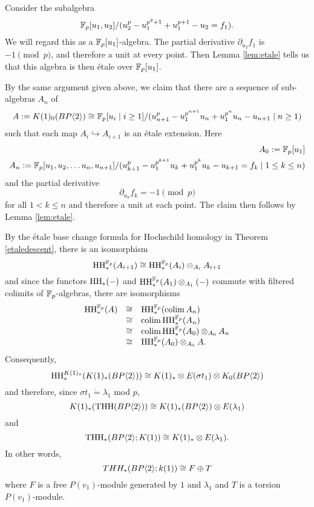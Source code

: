 \begin{ex}
	Consider the subalgebra
	\[
	\mathbb{F}_p[u_1,u_2]/(u_2^p-u_1^{p^2+1}+u_1^{p+1}-u_2=f_1).
	\]
	We will regard this as a $\mathbb{F}_p[u_1]$-algebra. The partial derivative $\partial_{u_2}f_1$ is $-1\pmod{p}$, and therefore a unit at every point. Then Lemma \ref{lem:etale} tells us that this algebra is then \'etale over $\mathbb{F}_p[u_1]$.
\end{ex} 

By the same argument given above, we claim that there are a sequence of sub-algebras $A_n$ of 
	\[
	A:= K(1)_0 (BP\langle 2 \rangle)\cong\mathbb{F}_p[u_i\mid i\geq 1]/(u_{n+1}^p-u_1^{p^{n+1}}u_n+u_1^{p^n}u_n-u_{n+1}\mid n\geq 1)
	\]
such that each map $A_i\hookrightarrow A_{i+1}$ is an \'etale extension. Here 
\begin{align*}
	A_0:=\mathbb{F}_p[u_1]\\
	A_n:=\mathbb{F}_p[u_1,u_2,\ldots u_n,u_{n+1}]/(u_{k+1}^p-u_1^{p^{k+1}}u_k+u_1^{p^k}u_k-u_{k+1} =f_{k} \mid 1\le k\le n)
\end{align*}
and the partial derivative 
\[\partial_{u_k}f_{k}=-1\pmod{p}\] 
for all $1<k\le n$ and therefore a unit at each point. The claim then follows by Lemma \ref{lem:etale}.

By the \'etale base change formula for Hochschild homology in Theorem \ref{etaledescent}, there is an isomorphism 
\[ \operatorname{HH}_*^{\mathbb{F}_p}(A_{i+1})\cong \operatorname{HH}_*^{\mathbb{F}_p}(A_i)\otimes_{A_i}A_{i+1}\]
and since the functors $\operatorname{HH}_*(-)$ and $ \operatorname{HH}_*^{\mathbb{F}_p}(A_1)\otimes_{A_1}(-)$ commute with filtered colimits of $\mathbb{F}_p$-algebras, there are isomorphisms 
	\[ 
	\begin{array}{rcl} 
		\operatorname{HH}_*^{\mathbb{F}_p}(A) & \cong &\operatorname{HH}_*^{\mathbb{F}_p}(\operatorname*{colim} A_n) \\
				         & \cong & \operatorname*{colim}  \operatorname{HH}_*^{\mathbb{F}_p}(A_n) \\
				         & \cong & \operatorname*{colim} \operatorname{HH}_*^{\mathbb{F}_p}(A_0)\otimes_{A_0}A_n \\
				         & \cong & \operatorname{HH}_*^{\mathbb{F}_p}(A_0)\otimes_{A_0}A. \\
	\end{array}
	\]
Consequently,
\[ \operatorname{HH}_*^{K(1)_*}(K(1)_*(BP\langle 2 \rangle))\cong K(1)_*\otimes E(\sigma t_1)\otimes K_0(BP\langle 2 \rangle) \]
and therefore, since $\sigma t_1\dot{=}\lambda_1$ mod $p$, 
\[ K(1)_*(\operatorname{THH}(BP\langle 2 \rangle))\cong K(1)_*(BP\langle 2 \rangle)\otimes E(\lambda_1) \]
and 
\[ \operatorname{THH}_*(BP\langle 2 \rangle;K(1))\cong K(1)_*\otimes E(\lambda_1). \]
In other words, 
\[ THH_*(BP\langle 2 \rangle;k(1)) \cong F\oplus T\]
where $F$ is a free $P(v_1)$-module generated by $1$ and $\lambda_1$ and $T$ is a torsion $P(v_1)$-module. 
\begin{comment}	
We therefore have the input needed to compute the Eilenberg-Moore spectral sequence,
\[
\Tor^{K(1)_*R}(K(1)_*K(1), K(1)_*\THH(R))\implies K(1)_*\THH(R;K(1))
\]
From the previous computation, the $E^2$-term is concentrated in $\Tor_0$ and is 
\[
K(1)_*K(1)\otimes E(\lambda_1).
\]		         
Thus, every class besides $1$ and $\lambda_1$ is $v_1$-torsion in $\THH_*(R;k(1))$. Since $\THH(R;K(1))$ is a $K(1)$-module, this implies that 
\[
\THH(R;K(1))\simeq K(1)\vee \Sigma^{2p-1}K(1).
\]
\end{comment}

